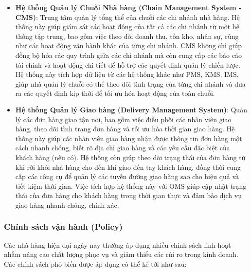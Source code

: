 \begin{itemize}
    \item \textbf{Hệ thống Quản lý Chuỗi Nhà hàng (Chain Management System - CMS)}: Trung tâm quản lý tổng thể của chuỗi các chi nhánh nhà hàng. Hệ thống này giúp giám sát các hoạt động của tất cả các chi nhánh từ một hệ thống tập trung, bao gồm việc theo dõi doanh thu, tồn kho, nhân sự, cũng như các hoạt động vận hành khác của từng chi nhánh. CMS không chỉ giúp đồng bộ hóa các quy trình giữa các chi nhánh mà còn cung cấp các báo cáo tài chính và hoạt động chi tiết để hỗ trợ các quyết định quản lý chiến lược. Hệ thống này tích hợp dữ liệu từ các hệ thống khác như PMS, KMS, IMS, giúp nhà quản lý chuỗi có thể theo dõi tình trạng của từng chi nhánh và đưa ra các quyết định kịp thời để tối ưu hóa hoạt động của toàn chuỗi.

    \item \textbf{Hệ thống Quản lý Giao hàng (Delivery Management System)}: Quản lý các đơn hàng giao tận nơi, bao gồm việc điều phối các nhân viên giao hàng, theo dõi tình trạng đơn hàng và tối ưu hóa thời gian giao hàng. Hệ thống này giúp các nhân viên giao hàng nhận được thông tin đơn hàng một cách nhanh chóng, biết rõ địa chỉ giao hàng và các yêu cầu đặc biệt của khách hàng (nếu có). Hệ thống còn giúp theo dõi trạng thái của đơn hàng từ khi rời khỏi nhà hàng cho đến khi giao đến tay khách hàng, đồng thời cung cấp các công cụ để quản lý các tuyến đường giao hàng sao cho hiệu quả và tiết kiệm thời gian. Việc tích hợp hệ thống này với OMS giúp cập nhật trạng thái của đơn hàng cho khách hàng trong thời gian thực và đảm bảo dịch vụ giao hàng nhanh chóng, chính xác.
\end{itemize}

\subsubsection{Chính sách vận hành (Policy)}
Các nhà hàng hiện đại ngày nay thường áp dụng nhiều chính sách linh hoạt nhằm nâng cao chất lượng phục vụ và giảm thiểu các rủi ro trong kinh doanh. Các chính sách phổ biến được áp dụng có thể kể tới như sau:

